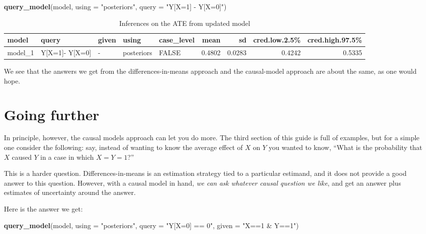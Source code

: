 \documentclass[
  12pt,
]{book}
\newenvironment{Shaded}{\begin{snugshade}}{\end{snugshade}}
\newcommand{\AttributeTok}[1]{\textcolor[rgb]{0.13,0.29,0.53}{#1}}
\newcommand{\FunctionTok}[1]{\textcolor[rgb]{0.13,0.29,0.53}{\textbf{#1}}}
\newcommand{\NormalTok}[1]{#1}
\newcommand{\StringTok}[1]{\textcolor[rgb]{0.31,0.60,0.02}{#1}}
\begin{document}
\begin{Shaded}
\begin{Highlighting}[]
\FunctionTok{query\_model}\NormalTok{(model, }\AttributeTok{using  =} \StringTok{"posteriors"}\NormalTok{, }\AttributeTok{query =} \StringTok{"Y[X=1] {-} Y[X=0]"}\NormalTok{) }
\end{Highlighting}
\end{Shaded}

\begin{table}

\caption{\label{tab:unnamed-chunk-9}Inferences on the ATE from updated model}
\centering
\begin{tabular}[t]{l|l|l|l|l|r|r|r|r}
\hline
model & query & given & using & case\_level & mean & sd & cred.low.2.5\% & cred.high.97.5\%\\
\hline
model\_1 & Y[X=1]- Y[X=0] & - & posteriors & FALSE & 0.4802 & 0.0283 & 0.4242 & 0.5335\\
\hline
\end{tabular}
\end{table}

We see that the answers we get from the differences-in-means approach and the causal-model approach are about the same, as one would hope.

\hypertarget{going-further}{%
\section{Going further}\label{going-further}}

In principle, however, the causal models approach can let you do more. The third section of this guide is full of examples, but for a simple one consider the following: say, instead of wanting to know the average effect of \(X\) on \(Y\) you wanted to know, ``What is the probability that \(X\) caused \(Y\) in a case in which \(X=Y=1\)?''

This is a harder question. Differences-in-means is an estimation strategy tied to a particular estimand, and it does not provide a good answer to this question. However, with a causal model in hand, \emph{we can ask whatever causal question we like}, and get an answer plus estimates of uncertainty around the answer.

Here is the answer we get:

\begin{Shaded}
\begin{Highlighting}[]
\FunctionTok{query\_model}\NormalTok{(model, }
            \AttributeTok{using =} \StringTok{"posteriors"}\NormalTok{, }
            \AttributeTok{query =} \StringTok{"Y[X=0] == 0"}\NormalTok{,}
            \AttributeTok{given =} \StringTok{"X==1 \& Y==1"}\NormalTok{)  }
\end{Highlighting}
\end{Shaded}
\end{document}

